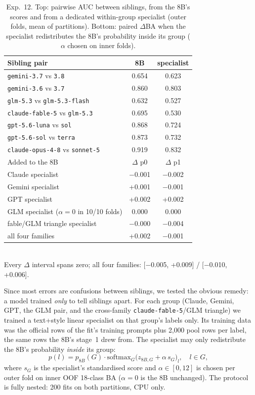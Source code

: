 \documentclass[10pt,twocolumn,letterpaper]{article}
\begin{document}
\begin{table}[t]
\centering\small
\caption{Exp.~12. Top: pairwise AUC between siblings, from the 8B's scores and from a dedicated within-group specialist (outer folds, mean of partitions). Bottom: paired $\Delta$BA when the specialist redistributes the 8B's probability inside its group ($\alpha$ chosen on inner folds).}
\label{tab:specialists}
\begin{tabular}{lcc}
\toprule
Sibling pair & 8B & specialist \\
\midrule
\texttt{gemini-3.7} vs \texttt{3.8} & 0.654 & 0.623 \\
\texttt{gemini-3.6} vs \texttt{3.7} & 0.860 & 0.803 \\
\texttt{glm-5.3} vs \texttt{glm-5.3-flash} & 0.632 & 0.527 \\
\texttt{claude-fable-5} vs \texttt{glm-5.3} & 0.695 & 0.530 \\
\texttt{gpt-5.6-luna} vs \texttt{sol} & 0.868 & 0.724 \\
\texttt{gpt-5.6-sol} vs \texttt{terra} & 0.873 & 0.732 \\
\texttt{claude-opus-4-8} vs \texttt{sonnet-5} & 0.919 & 0.832 \\
\midrule
Added to the 8B & $\Delta$ p0 & $\Delta$ p1 \\
\midrule
Claude specialist & $-$0.001 & $-$0.002 \\
Gemini specialist & +0.001 & $-$0.001 \\
GPT specialist & +0.002 & +0.002 \\
GLM specialist ($\alpha=0$ in 10/10 folds) & 0.000 & 0.000 \\
fable/GLM triangle specialist & $-$0.000 & $-$0.004 \\
all four families & +0.002 & $-$0.001 \\
\bottomrule
\end{tabular}\\[2pt]
{\footnotesize Every $\Delta$ interval spans zero; all four families: [$-$0.005, +0.009] / [$-$0.010, +0.006].}
\end{table}

Since most errors are confusions between siblings, we tested the obvious remedy: a model trained \emph{only} to tell siblings apart. For each group (Claude, Gemini, GPT, the GLM pair, and the cross-family \texttt{claude-fable-5}/GLM triangle) we trained a text+style linear specialist on that group's labels only. Its training data was the official rows of the fit's training prompts plus 2,000 pool rows per label, the same rows the 8B's stage~1 drew from. The specialist may only redistribute the 8B's probability \emph{inside} its group:
\[
p(l) = p_{8B}(G)\cdot\mathrm{softmax}_{G}\big(z_{8B,G} + \alpha\, s_G\big)_l, \quad l\in G,
\]
where $s_G$ is the specialist's standardised score and $\alpha\in[0,12]$ is chosen per outer fold on inner OOF 18-class BA ($\alpha=0$ is the 8B unchanged). The protocol is fully nested: 200 fits on both partitions, CPU only.
\end{document}
